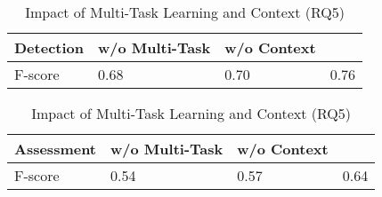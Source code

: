 \begin{table}[t]
	\caption{Impact of Multi-Task Learning and Context (RQ5)}
	\vspace{-10pt}
	\begin{center}
\small
		\tabcolsep 2.5pt
		\renewcommand{\arraystretch}{1}
                \begin{tabular}
                {p{1.5cm}<{\centering}|p{2.5cm}<{\centering}| p{2.5cm}<{\centering}| p{0.6cm}<{\centering}}
			
			\hline
			 Detection                  &  {\tool} w/o Multi-Task  &  {\tool} w/o Context & {\tool} \\ 
			\hline
		       F-score    & 0.68  &  0.70 & 0.76       \\
			\hline
		\end{tabular}
		\label{tab:impact-multi-task-on-detection}
	\end{center}
\end{table}

\begin{table}[t]
	\caption{Impact of Multi-Task Learning and Context (RQ5)}
	\vspace{-10pt}
	\begin{center}
\small
		\tabcolsep 2.5pt
		\renewcommand{\arraystretch}{1}
                \begin{tabular}
                {p{1.5cm}<{\centering}|p{2.5cm}<{\centering}| p{2.5cm}<{\centering}| p{0.6cm}<{\centering}}
			
			\hline
			 Assessment                  &  {\tool} w/o Multi-Task  &  {\tool} w/o Context & {\tool} \\ 
			\hline
		       F-score   & 0.54  &  0.57 & 0.64     \\
			\hline
		\end{tabular}
		\label{tab:impact-multi-task-on-assessment}
	\end{center}
\end{table}

%			

